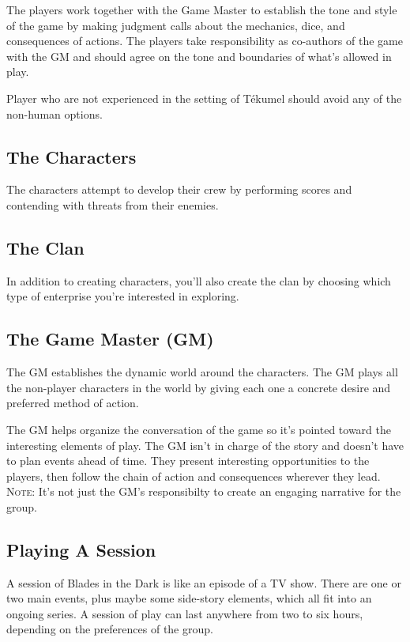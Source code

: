 The players work together with the Game Master to establish the tone and style of the game by making judgment calls about the mechanics, dice, and consequences of actions. The players take responsibility as co-authors of the game with the GM and should agree on the tone and boundaries of what's allowed in play.

Player who are not experienced in the setting of Tékumel should avoid any of the non-human options.

\subsection{The Characters}

The characters attempt to develop their crew by performing scores and contending with threats from their enemies.
 
\subsection{The Clan}

In addition to creating characters, you’ll also create the clan by choosing which type of enterprise you’re interested in exploring.

\subsection{The Game Master (GM)}

The GM establishes the dynamic world around the characters. The GM plays all the non-player characters in the world by giving each one a concrete desire and preferred method of action.

The GM helps organize the conversation of the game so it’s pointed toward the interesting elements of play. The GM isn’t in charge of the story and doesn’t have to plan events ahead of time. They present interesting opportunities to the players, then follow the chain of action and consequences wherever they lead. \textsc{Note:} It's not just the GM's responsibilty to create an engaging narrative for the group. 

\subsection{Playing A Session}

A session of Blades in the Dark is like an episode of a TV show. There are one or two main events, plus maybe some side-story elements, which all fit into an ongoing series. A session of play can last anywhere from two to six hours, depending on the preferences of the group.

